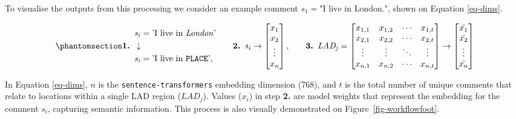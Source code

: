 \documentclass[
]{article}
\begin{document}
To visualise the outputs from this processing we consider an example
comment \(s_1 = \text{"I live in London."}\), shown on Equation
\ref{eq-dims}.

\begin{equation}\phantomsection\label{eq-dims}{
\begin{aligned}
\mathit{s_{i}} &= \text{'I live in \textit{London}'} \\
\textbf{1. }\downarrow \\
\mathit{s_{i}} &= \text{'I live in \texttt{PLACE}'},
\end{aligned}
\qquad
\begin{aligned}
\textbf{2. }\mathit{s_{i}} \rightarrow 
\begin{bmatrix}
x_{1} \\
x_{2} \\
\vdots\\
x_{n}
\end{bmatrix},
\end{aligned}
\qquad
\begin{aligned}
\textbf{3. }\mathit{LAD_{j}} = 
\begin{bmatrix}
x_{1,1} & x_{1,2} & \cdots & x_{1,t} \\
x_{2,1} & x_{2,2} & \cdots & x_{2,t} \\
\vdots  & \vdots  & \ddots & \vdots  \\
x_{n,1} & x_{n,2} & \cdots & x_{n,t}
 \end{bmatrix} \rightarrow \begin{bmatrix}
\bar{x_{1}} \\
\bar{x_{2}} \\
\vdots \\
\bar{x_{n}}
\end{bmatrix}
\end{aligned}
}\end{equation}

In Equation \ref{eq-dims}, \(n\) is the \texttt{sentence-transformers}
embedding dimension (768), and \(t\) is the total number of unique
comments that relate to locations within a single LAD region
(\(LAD_j\)). Values (\(x_i\)) in step \textbf{2.} are model weights that
represent the embedding for the comment \(s_i\), capturing semantic
information. This process is also visually demonstrated on
Figure~\ref{fig-workflowfoot}.
\end{document}
